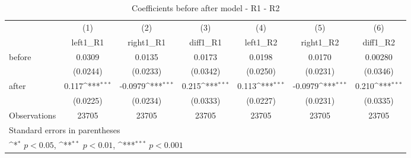 \begin{table}[htbp]\centering \footnotesize
\def\sym#1{\ifmmode^{#1}\else\(^{#1}\)\fi}
\caption{Coefficients before after model - R1 - R2}
\begin{tabular}{l*{6}{c}}
\hline\hline
                    &\multicolumn{1}{c}{(1)}&\multicolumn{1}{c}{(2)}&\multicolumn{1}{c}{(3)}&\multicolumn{1}{c}{(4)}&\multicolumn{1}{c}{(5)}&\multicolumn{1}{c}{(6)}\\
                    &\multicolumn{1}{c}{left1\_R1}&\multicolumn{1}{c}{right1\_R1}&\multicolumn{1}{c}{diff1\_R1}&\multicolumn{1}{c}{left1\_R2}&\multicolumn{1}{c}{right1\_R2}&\multicolumn{1}{c}{diff1\_R2}\\
\hline
before              &      0.0309         &      0.0135         &      0.0173         &      0.0198         &      0.0170         &     0.00280         \\
                    &    (0.0244)         &    (0.0233)         &    (0.0342)         &    (0.0250)         &    (0.0231)         &    (0.0346)         \\
[1em]
after               &       0.117\sym{***}&     -0.0979\sym{***}&       0.215\sym{***}&       0.113\sym{***}&     -0.0979\sym{***}&       0.210\sym{***}\\
                    &    (0.0225)         &    (0.0234)         &    (0.0333)         &    (0.0227)         &    (0.0231)         &    (0.0335)         \\
\hline
Observations        &       23705         &       23705         &       23705         &       23705         &       23705         &       23705         \\
\hline\hline
\multicolumn{7}{l}{\footnotesize Standard errors in parentheses}\\
\multicolumn{7}{l}{\footnotesize \sym{*} \(p<0.05\), \sym{**} \(p<0.01\), \sym{***} \(p<0.001\)}\\
\end{tabular}
\end{table}
